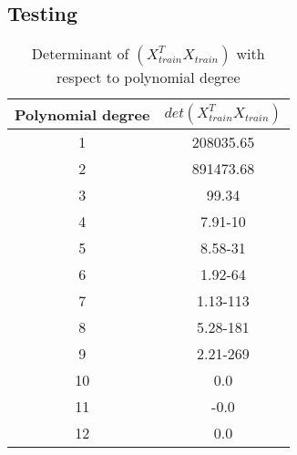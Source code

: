 \subsection{Testing}
\begin{table}
    \centering
    \caption{Determinant of $(X^T_{train}X_{train})$ with respect to polynomial
    degree}  
    \begin{tabular}{|c|c|}
        \hline
        Polynomial degree & $det(X_{train}^T X_{train})$  \\
        \hline
        1 & 208035.65\\
        \hline
        2 & 891473.68\\
        \hline
        3 & 99.34\\
        \hline
        4 & 7.91-10 \\
        \hline
        5 & 8.58-31 \\
        \hline
        6 & 1.92-64 \\
        \hline
        7 & 1.13-113 \\
        \hline
        8 & 5.28-181 \\
        \hline
        9 & 2.21-269 \\
        \hline
        10 & 0.0 \\
        \hline
        11 & -0.0 \\
        \hline
        12 & 0.0 \\
        \hline
         
    \end{tabular} 
\end{table}




